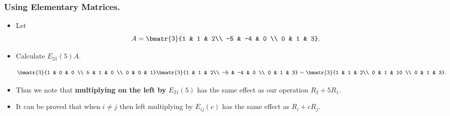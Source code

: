 \begin{frame}%
  \frametitle{Using Elementary Matrices.}
  \begin{itemize}%
\item Let
$$A = \bmatr{3}{1 & 1 & 2\\
                -5 & -4 & 0 \\
                0 & 1 & 3}.$$
\item Calculate $E_{21}(5)A$.

$$\bmatr{3}{1 & 0 & 0 \\
            5 & 1 & 0 \\
            0 & 0 & 1}
\bmatr{3}{1 & 1 & 2\\
                -5 & -4 & 0 \\
                0 & 1 & 3} =
\bmatr{3}{1 & 1 & 2\\
          0 & 1 & 10 \\
          0 & 1 & 3}.$$
\item Thus we note that {\bf multiplying on the left by }$E_{21}(5)$
has the same effect as our operation $R_2+5R_1$.

\item It can be proved that when $i\neq j$ then left multiplying by
$E_{ij}(c)$ has the same effect as $R_i+cR_j$.


\end{itemize}
\end{frame}


